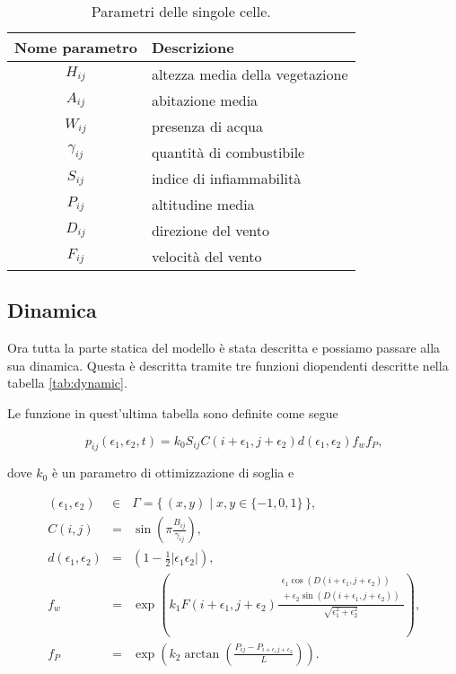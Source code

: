 \documentclass[draft]{article}
\newcommand{\e}{\epsilon}
\begin{document}
\begin{table}
\centering
\begin{tabular}{|c|l|}
	\hline
	\textbf{Nome parametro} & \textbf{Descrizione}\\
	\hline
	$H_{ij}$ & altezza media della vegetazione\\
	$A_{ij}$ & abitazione media\\
	$W_{ij}$ & presenza di acqua\\
	$\gamma_{ij}$ & quantità di combustibile\\ %
	$S_{ij}$ & indice di infiammabilità\\
	$P_{ij}$ & altitudine media\\
	$D_{ij}$ & direzione del vento\\
	$F_{ij}$ & velocità del vento\\
	\hline
\end{tabular}
\caption{Parametri delle singole celle.}
\label{tab:params}
\end{table}

\subsection{Dinamica}

Ora tutta la parte statica del modello è stata descritta e possiamo passare alla
sua dinamica. Questa è descritta tramite tre funzioni diopendenti descritte
nella tabella \ref{tab:dynamic}.

Le funzione in quest'ultima tabella sono definite come segue


\begin{equation}
p_{ij}(\e_1, \e_2, t) = k_0 S_{ij} C(i+\e_1, j+\e_2) d(\e_1, \e_2) f_w f_P\textrm{,}
\end{equation}

dove $k_0$ è un parametro di ottimizzazione di soglia e

\begin{eqnarray}
(\e_1, \e_2) &\in& \Gamma = \{\,(x, y) \mid x, y \in \{-1, 0, 1\}\,\}\textrm{,}\\
C(i,j) &=& \sin\left(\pi\frac{B_{ij}}{\gamma_{ij}}\right)\textrm{,}\label{eq:combust}\\
d(\e_1,\e_2) &=& \left(1-\frac{1}{2}|\e_1\e_2|\right)\textrm{,}\label{eq:disom}\\
f_w &=& \exp\left(k_1 F(i+\e_1, j+\e_2)\frac{\begin{array}{c}\e_1\cos(D(i+\e_1,j+\e_2))\\
        \mbox{}+\e_2\sin(D(i+\e_1,j+\e_2))\end{array}}{\sqrt{\e_1^2 + \e_2^2}}\right)\textrm{,}\label{eq:wind}\\
f_P &=& \exp\left(k_2\arctan\left(\frac{P_{ij}-P_{i+\e_1j+\e_2}}{L}\right)\right)\textrm{.}\label{eq:slope}
\end{eqnarray}
\end{document}
